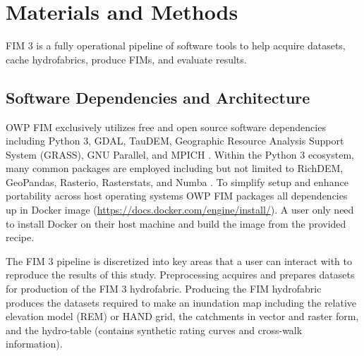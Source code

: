 \section{Materials and Methods}
%
FIM 3 is a fully operational pipeline of software tools to help acquire datasets, cache hydrofabrics, produce FIMs, and evaluate results.
%
\subsection{Software Dependencies and Architecture}
%
OWP FIM exclusively utilizes free and open source software dependencies including Python 3, GDAL, TauDEM, Geographic Resource Analysis Support System (GRASS), GNU Parallel, and MPICH \cite{python382,gdal2020,tarboton2005terrain,grass2020,tange2015gnu,amer2021mpich}.
Within the Python 3 ecosystem, many common packages are employed including but not limited to RichDEM, GeoPandas, Rasterio, Rasterstats, and Numba \cite{barnes2018richdem,jordahl2014geopandas,lam2015numba}. 
To simplify setup and enhance portability across host operating systems OWP FIM packages all dependencies up in Docker image (\url{https://docs.docker.com/engine/install/}). 
A user only need to install Docker on their host machine and build the image from the provided recipe. 

The FIM 3 pipeline is discretized into key areas that a user can interact with to reproduce the results of this study. Preprocessing acquires and prepares datasets for production of the FIM 3 hydrofabric. 
Producing the FIM hydrofabric produces the datasets required to make an inundation map including the relative elevation model (REM) or HAND grid, the catchments in vector and raster form, and the hydro-table (contains synthetic rating curves and cross-walk information).
%
